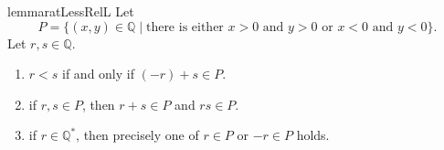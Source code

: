 \Newpage
\begin{restatable}{lemma}{ratLessRelL} %
	\label{rat:l:less_relation}
	Let
	\[
		P = \{ (x, y) \in \mathbb{Q} \mid \text{there is either $x > 0$ and $y > 0$ or $x < 0$ and $y < 0$} \}.
	\]
	Let $r, s \in \mathbb{Q}$.
	\begin{enumerate}
		\item \label{rat:l:less_relation:1}
		      $r < s$ if and only if $(-r) + s \in P$.
		\item \label{rat:l:less_relation:2}
		      if $r, s \in P$, then $r + s \in P$ and $r s \in P$.
		\item \label{rat:l:less_relation:3}
		      if $r \in \mathbb{Q}^{*}$, then precisely one of $r \in P$ or $-r \in P$ holds.
	\end{enumerate}
\end{restatable}


